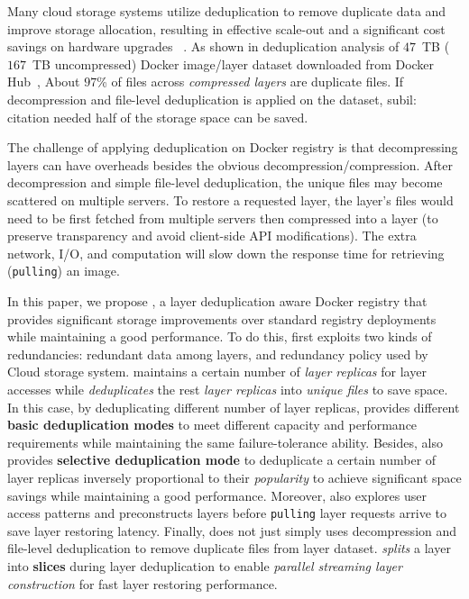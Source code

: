 %
%
%
%
Many cloud storage systems utilize deduplication to remove duplicate data and
improve storage allocation, resulting in effective scale-out and a significant
cost savings on hardware upgrades ~\cite{Ng:2012:PDD:2245276.2245361, 6753819,
5655241}.
%
As shown in deduplication analysis of $47$~TB ($167$~TB uncompressed) Docker
image/layer dataset downloaded from Docker Hub~\cite{dedupanalysis}, About
$97$\% of files across \emph{compressed layers} are duplicate files.
%
If decompression and file-level deduplication is applied on the dataset,
subil: citation needed half of the storage space can be saved.


%
%
The challenge of applying deduplication on Docker registry is that
decompressing layers can have overheads besides the obvious
decompression/compression. 
%
After decompression and simple file-level deduplication, the unique files may
become scattered on multiple servers.
%
To restore a requested layer, the
layer's files would need to be first fetched from multiple servers then
compressed into a layer (to preserve transparency and avoid client-side API
modifications).
%
%
The extra network, I/O, and computation will slow down the response time for
retrieving (\texttt{pulling}) an image.

%
%
%
%
In this paper, we propose \sysname, a layer deduplication aware Docker registry
that provides significant storage improvements over standard registry
deployments while maintaining a good performance.
%
To do this, \sysname first
exploits two kinds of redundancies: redundant data among layers, and redundancy
policy used by Cloud storage system.
%
\sysname maintains a certain number of
\emph{layer replicas} for layer accesses while \emph{deduplicates} the rest
\emph{layer replicas} into \emph{unique files} to save space.
%
In this case, by
deduplicating different number of layer replicas, \sysname provides different
\textbf{basic deduplication modes} to meet different capacity and performance
requirements while maintaining the same failure-tolerance ability.
%
Besides,
\sysname also provides \textbf{selective deduplication mode} to deduplicate a
certain number of layer replicas inversely proportional to their
\emph{popularity} to achieve significant space savings while maintaining a good
performance.
%
Moreover, \sysname also explores user access patterns and
preconstructs layers before \texttt{pulling} layer requests arrive to save
layer restoring latency.
%
Finally, \sysname does not just simply uses
decompression and file-level deduplication to remove duplicate files from layer
dataset.
%
\sysname \emph{splits} a layer into \textbf{slices} during layer
deduplication to enable \emph{parallel streaming layer construction} for fast
layer restoring performance.


